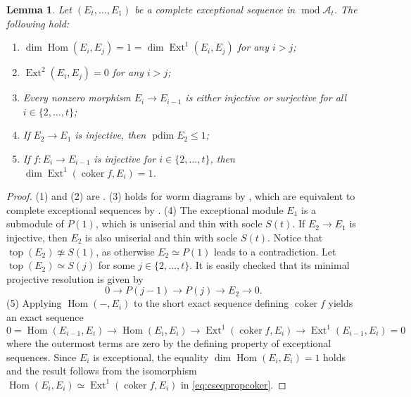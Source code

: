 \documentclass[10pt,twoside, a4paper,reqno]{amsart}
\DeclareMathOperator{\mods}{mod}
\DeclareMathOperator{\Ext}{Ext}
\DeclareMathOperator{\Hom}{Hom}
\DeclareMathOperator{\projdim}{pdim}
\DeclareMathOperator{\coker}{coker}
\DeclareMathOperator{\topp}{top}
\newcommand{\A}{\mathscr{A}}
\newtheorem{lemma}[theorem]{Lemma}
\theoremstyle{definition}
\begin{document}
\begin{lemma}\label{lem:completeexcepprop}
    Let $(E_t, \dots, E_1)$ be a complete exceptional sequence in $\mods \A_t$. The following hold:
    \begin{enumerate}
        \item $\dim \Hom(E_i, E_j) = 1 = \dim \Ext^1(E_i,E_j)$ for any $i>j$;
        \item $\Ext^2(E_i, E_j)=0$ for any $i>j$; 
        \item Every nonzero morphism $E_i \to E_{i-1}$ is either injective or surjective for all $i \in \{2, \dots, t\}$;
        \item If $E_2 \to E_1$ is injective, then $\projdim E_2 \leq 1$;
        \item If $f:E_i \to E_{i-1}$ is injective for $i \in \{2, \dots, t\}$, then $\dim \Ext^1(\coker f, E_i)=1$.
    \end{enumerate} 
\end{lemma}
\begin{proof}
    (1) and (2) are \cite[Cor. 3.7]{HillePloog2019}. (3) holds for worm diagrams by \cite[Lem. 3.2]{HillePloog2019}, which are equivalent to complete exceptional sequences by \cite[Prop. 3.3, Cor. 3.6]{HillePloog2019}. (4) The exceptional module $E_1$ is a submodule of $P(1)$, which is uniserial and thin with socle $S(t)$. If $E_2 \to E_1$ is injective, then $E_2$ is also uniserial and thin with socle $S(t)$. Notice that $\topp(E_2) \not \simeq S(1)$, as otherwise $E_2 \simeq P(1)$ leads to a contradiction. Let $\topp(E_2) \simeq S(j)$ for some $j \in \{2, \dots, t\}$. It is easily checked that its minimal projective resolution is given by 
    \[ 0 \to P(j-1) \to P(j) \to E_2 \to 0. \] 
    (5) Applying $\Hom(-,E_i)$ to the short exact sequence defining $\coker f$ yields an exact sequence
    \begin{equation}\label{eq:cseqpropcoker} 0 = \Hom(E_{i-1},E_i) \to \Hom(E_i,E_i) \to \Ext^1(\coker f, E_i) \to \Ext^1(E_{i-1},E_i) = 0\end{equation}
    where the outermost terms are zero by the defining property of exceptional sequences. Since $E_i$ is exceptional, the equality $\dim \Hom(E_i, E_i)=1$ holds and the result follows from the isomorphism $\Hom(E_i, E_i) \simeq \Ext^1(\coker f, E_i)$ in \cref{eq:cseqpropcoker}.
\end{proof}
\end{document}
